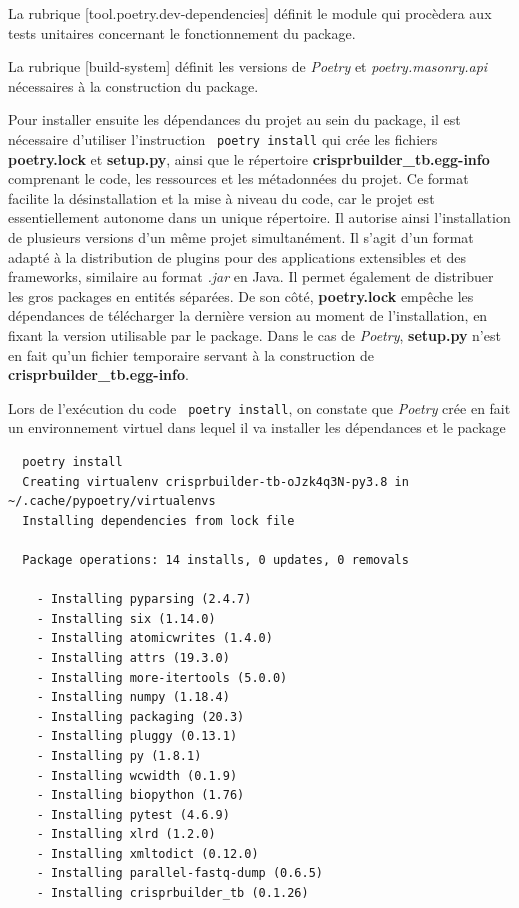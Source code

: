 \documentclass[twoside,a4paper,11pt,frenchb,openany]{report}
\begin{document}
La rubrique [tool.poetry.dev-dependencies] définit le module qui procèdera aux tests unitaires concernant le fonctionnement du package.

La rubrique [build-system] définit les versions de \textit{Poetry} et \textit{poetry.masonry.api} nécessaires à la construction du package.

Pour installer ensuite les dépendances du projet au sein du package, il est nécessaire d’utiliser l’instruction
\texttt{ poetry install}
qui crée les fichiers \textbf{poetry.lock} et \textbf{setup.py}, ainsi que le répertoire \textbf{crisprbuilder\_tb.egg-info} comprenant le code, les ressources et les métadonnées du projet. Ce format facilite la désinstallation et la mise à niveau du code, car le projet est essentiellement autonome dans un unique répertoire. Il autorise ainsi l'installation de plusieurs versions d'un même projet simultanément. Il s'agit d'un format adapté à la distribution de plugins pour des applications extensibles et des frameworks, similaire au format \textit{.jar} en Java. Il permet également de distribuer les gros packages en entités séparées. De son côté, \textbf{poetry.lock} empêche les dépendances de télécharger la dernière version au moment de l’installation, en fixant la version utilisable par le package. Dans le cas de \textit{Poetry}, \textbf{setup.py} n'est en fait qu'un fichier temporaire servant à la construction de \textbf{crisprbuilder\_tb.egg-info}. 

Lors de l'exécution du code \texttt{ poetry install}, on constate que \textit{Poetry} crée en fait un environnement virtuel dans lequel il va installer les dépendances et le package

\begin{verbatim}  poetry install
  Creating virtualenv crisprbuilder-tb-oJzk4q3N-py3.8 in ~/.cache/pypoetry/virtualenvs
  Installing dependencies from lock file

  Package operations: 14 installs, 0 updates, 0 removals

    - Installing pyparsing (2.4.7)
    - Installing six (1.14.0)
    - Installing atomicwrites (1.4.0)
    - Installing attrs (19.3.0)
    - Installing more-itertools (5.0.0)
    - Installing numpy (1.18.4)
    - Installing packaging (20.3)
    - Installing pluggy (0.13.1)
    - Installing py (1.8.1)
    - Installing wcwidth (0.1.9)
    - Installing biopython (1.76)
    - Installing pytest (4.6.9)
    - Installing xlrd (1.2.0)
    - Installing xmltodict (0.12.0)
    - Installing parallel-fastq-dump (0.6.5)
    - Installing crisprbuilder_tb (0.1.26)\end{verbatim}
\end{document}
